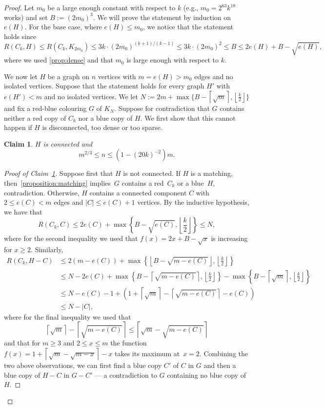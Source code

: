 \documentclass{article}
\newtheorem{claim}[theorem]{Claim}
\newcommand*{\myproofname}{Proof}
\newenvironment{claimproof}[1][\myproofname]{\begin{proof}[#1]\renewcommand*{\qedsymbol}{\(\diamondsuit\)}}{\end{proof}}
\newcommand*{\bceil}[1]{\left\lceil #1\right\rceil}
\newcommand*{\bfloor}[1]{\left\lfloor #1\right\rfloor}
\begin{document}
\begin{proof}
    Let $m_0$ be a large enough constant with respect to $k$ (e.g., $m_0 = 2^{63} k^{18}$ works) and set $B := (2m_0)^3$.
    We will prove the statement by induction on $e(H)$. 
    For the base case, where $e(H) \leq m_0$, we notice that the statement holds since
    \[
        R(C_k, H) \leq R(C_k, K_{2m_0}) \leq 3k \cdot (2m_0)^{(k+1)/(k-1)} \leq 3k \cdot (2m_0)^2 \leq B \leq 2e(H) + B - \sqrt{e(H)},
    \]
    where we used \cref{prop:dense} and that $m_0$ is large enough with respect to $k$.

    We now let $H$ be a graph on $n$ vertices with $m = e(H) > m_0$ edges and no isolated vertices.
    Suppose that the statement holds for every graph $H'$ with $e(H') < m$ and no isolated vertices.
    We let $N := 2m + \max\{ B - \bceil{\sqrt{m}}, \bfloor{\frac{k}{2}} \}$ and fix a red-blue colouring $G$ of $K_N$.
    Suppose for contradiction that $G$ contains neither a red copy of $C_k$ nor a blue copy of $H$.
    We first show that this cannot happen if $H$ is disconnected, too dense or too sparse.

    \begin{claim}\label{claim:connected+dense}
        $H$ is connected and 
        \[
            m^{2/3} \leq n \leq (1 - (20k)^{-2})m.
        \]
    \end{claim}
    \begin{claimproof}[Proof of Claim~\ref{claim:connected+dense}]
        Suppose first that $H$ is not connected.
        If $H$ is a matching, then~\cref{proposition:matching} implies~$G$ contains a red~$C_k$ or a blue~$H$, contradiction.
        Otherwise, $H$ contains a connected component $C$ with $2 \leq e(C) < m$ edges and $|C| \leq e(C) + 1$  vertices.
        By the inductive hypothesis, we have that
        \[
            R(C_k, C) \leq 2e(C) + \max \left\{ B - \sqrt{e(C)}, \bfloor{\frac{k}{2}} \right\} \leq N,
        \]
        where for the second inequality we used that $f(x) = 2x +B - \sqrt{x}$ is increasing for $x \geq 2$.
        Similarly,
        \begin{align*}
            R(C_k, H - C) &\leq 2(m -e(C)) + \max\left\{ \bfloor { B - \sqrt{m -e(C)} }, \bfloor{\frac{k}{2}} \right\}\\
            &\leq N - 2e(C)  + \max\left\{B - \bceil{\sqrt{m - e(C)}}, \bfloor{\frac{k}{2}}\right\} - \max\left\{ B - \bceil{\sqrt{m}}, \bfloor{\frac{k}{2}} \right\} \\
            &\leq N - e(C) -1 + \left( 1+ \bceil{\sqrt{m}} - \bceil{\sqrt{m - e(C)}} - e(C)  \right)\\
            &\leq N - |C|,
        \end{align*}
        where for the final inequality we used that
        \[
            \bceil{\sqrt{m}} - \bceil{\sqrt{m - e(C)}} \leq \bceil{\sqrt{m} - \sqrt{m - e(C)}}
        \]
        and that for $m \geq 3$ and $2 \leq x \leq m$ the function $f(x) = 1 + \bceil{\sqrt{m} - \sqrt{m-x}} -x$ takes its maximum at~$x=2$.
        Combining the two above observations, we can first find a blue copy $C'$ of $C$ in $G$ and then a blue copy of $H- C$ in $G - C'$ --- a contradiction to $G$ containing no blue copy of $H$.


\end{claimproof}
\end{proof}
\end{document}
